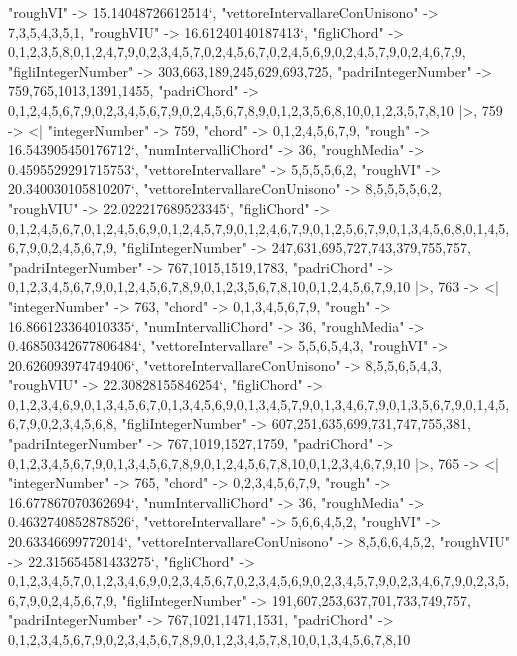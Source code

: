 \documentclass[
]{article}
\begin{document}
\begin{DatasetVerbatim}
    "roughVI" -> 15.14048726612514`,
    "vettoreIntervallareConUnisono" -> {7,3,5,4,3,5,1},
    "roughVIU" -> 16.61240140187413`,
    "figliChord" -> {{0,1,2,3,5,8},{0,1,2,4,7,9},{0,2,3,4,5,7},{0,2,4,5,6,7},{0,2,4,5,6,9},{0,2,4,5,7,9},{0,2,4,6,7,9}},
    "figliIntegerNumber" -> {303,663,189,245,629,693,725},
    "padriIntegerNumber" -> {759,765,1013,1391,1455},
    "padriChord" -> {{0,1,2,4,5,6,7,9},{0,2,3,4,5,6,7,9},{0,2,4,5,6,7,8,9},{0,1,2,3,5,6,8,10},{0,1,2,3,5,7,8,10}}
  |>,
  759 -> <|
    "integerNumber" -> 759,
    "chord" -> {0,1,2,4,5,6,7,9},
    "rough" -> 16.543905450176712`,
    "numIntervalliChord" -> 36,
    "roughMedia" -> 0.4595529291715753`,
    "vettoreIntervallare" -> {5,5,5,5,6,2},
    "roughVI" -> 20.340030105810207`,
    "vettoreIntervallareConUnisono" -> {8,5,5,5,5,6,2},
    "roughVIU" -> 22.022217689523345`,
    "figliChord" -> {{0,1,2,4,5,6,7},{0,1,2,4,5,6,9},{0,1,2,4,5,7,9},{0,1,2,4,6,7,9},{0,1,2,5,6,7,9},{0,1,3,4,5,6,8},{0,1,4,5,6,7,9},{0,2,4,5,6,7,9}},
    "figliIntegerNumber" -> {247,631,695,727,743,379,755,757},
    "padriIntegerNumber" -> {767,1015,1519,1783},
    "padriChord" -> {{0,1,2,3,4,5,6,7,9},{0,1,2,4,5,6,7,8,9},{0,1,2,3,5,6,7,8,10},{0,1,2,4,5,6,7,9,10}}
  |>,
  763 -> <|
    "integerNumber" -> 763,
    "chord" -> {0,1,3,4,5,6,7,9},
    "rough" -> 16.866123364010335`,
    "numIntervalliChord" -> 36,
    "roughMedia" -> 0.46850342677806484`,
    "vettoreIntervallare" -> {5,5,6,5,4,3},
    "roughVI" -> 20.626093974749406`,
    "vettoreIntervallareConUnisono" -> {8,5,5,6,5,4,3},
    "roughVIU" -> 22.30828155846254`,
    "figliChord" -> {{0,1,2,3,4,6,9},{0,1,3,4,5,6,7},{0,1,3,4,5,6,9},{0,1,3,4,5,7,9},{0,1,3,4,6,7,9},{0,1,3,5,6,7,9},{0,1,4,5,6,7,9},{0,2,3,4,5,6,8}},
    "figliIntegerNumber" -> {607,251,635,699,731,747,755,381},
    "padriIntegerNumber" -> {767,1019,1527,1759},
    "padriChord" -> {{0,1,2,3,4,5,6,7,9},{0,1,3,4,5,6,7,8,9},{0,1,2,4,5,6,7,8,10},{0,1,2,3,4,6,7,9,10}}
  |>,
  765 -> <|
    "integerNumber" -> 765,
    "chord" -> {0,2,3,4,5,6,7,9},
    "rough" -> 16.677867070362694`,
    "numIntervalliChord" -> 36,
    "roughMedia" -> 0.4632740852878526`,
    "vettoreIntervallare" -> {5,6,6,4,5,2},
    "roughVI" -> 20.63346699772014`,
    "vettoreIntervallareConUnisono" -> {8,5,6,6,4,5,2},
    "roughVIU" -> 22.315654581433275`,
    "figliChord" -> {{0,1,2,3,4,5,7},{0,1,2,3,4,6,9},{0,2,3,4,5,6,7},{0,2,3,4,5,6,9},{0,2,3,4,5,7,9},{0,2,3,4,6,7,9},{0,2,3,5,6,7,9},{0,2,4,5,6,7,9}},
    "figliIntegerNumber" -> {191,607,253,637,701,733,749,757},
    "padriIntegerNumber" -> {767,1021,1471,1531},
    "padriChord" -> {{0,1,2,3,4,5,6,7,9},{0,2,3,4,5,6,7,8,9},{0,1,2,3,4,5,7,8,10},{0,1,3,4,5,6,7,8,10}}

\end{DatasetVerbatim}
\end{document}

